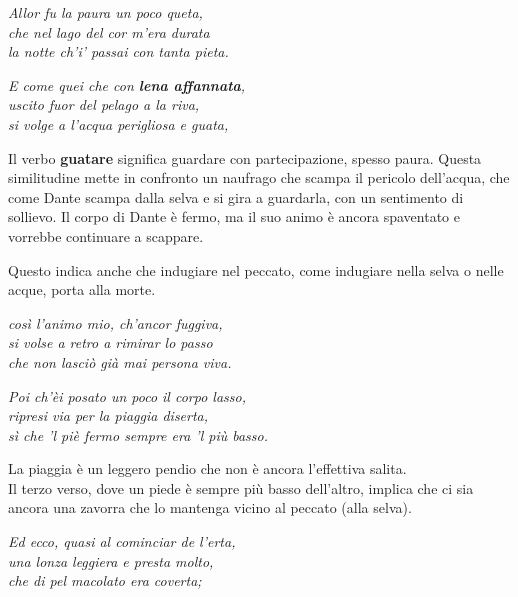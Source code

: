 \documentclass[a4paper]{article}
\begin{document}
\begin{center}
    \textit{Allor fu la paura un poco queta,} \\
    \textit{che nel lago del cor m'era durata} \\
    \textit{la notte ch'i' passai con tanta pieta.}
\end{center}

\begin{center}
    \textit{E come quei che con \textbf{lena affannata},} \\
    \textit{uscito fuor del pelago a la riva,} \\
    \textit{si volge a l'acqua perigliosa e guata,}
\end{center}

Il verbo \textbf{guatare} significa guardare con partecipazione, spesso paura.
Questa similitudine mette in confronto un naufrago che scampa il pericolo dell'acqua,
che come Dante scampa dalla selva e si gira a guardarla, con un sentimento di sollievo.
Il corpo di Dante è fermo, ma il suo animo è ancora spaventato e vorrebbe continuare a scappare.

Questo indica anche che indugiare nel peccato, come indugiare nella selva o nelle acque, porta alla morte.

\begin{center}
    \textit{così l'animo mio, ch'ancor fuggiva,} \\
    \textit{si volse a retro a rimirar lo passo} \\
    \textit{che non lasciò già mai persona viva.}
\end{center}

\begin{center}
    \textit{Poi ch'èi posato un poco il corpo lasso,} \\
    \textit{ripresi via per la piaggia diserta,} \\
    \textit{sì che 'l piè fermo sempre era 'l più basso.}
\end{center}

La piaggia è un leggero pendio che non è ancora l'effettiva salita.
\\
Il terzo verso, dove un piede è sempre più basso dell'altro,
implica che ci sia ancora una zavorra che lo mantenga vicino al peccato (alla selva).

\begin{center}
    \textit{Ed ecco, quasi al cominciar de l'erta,} \\
    \textit{una lonza leggiera e presta molto,} \\
    \textit{che di pel macolato era coverta;}
\end{center}
\end{document}
